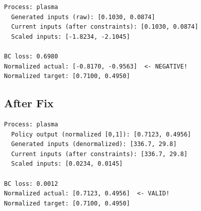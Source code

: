 \documentclass[11pt,a4paper]{article}
\begin{document}
\begin{verbatim}
Process: plasma
  Generated inputs (raw): [0.1030, 0.0874]
  Current inputs (after constraints): [0.1030, 0.0874]
  Scaled inputs: [-1.8234, -2.1045]

BC loss: 0.6980
Normalized actual: [-0.8170, -0.9563]  <- NEGATIVE!
Normalized target: [0.7100, 0.4950]
\end{verbatim}

\subsection{After Fix}

\begin{verbatim}
Process: plasma
  Policy output (normalized [0,1]): [0.7123, 0.4956]
  Generated inputs (denormalized): [336.7, 29.8]
  Current inputs (after constraints): [336.7, 29.8]
  Scaled inputs: [0.0234, 0.0145]

BC loss: 0.0012
Normalized actual: [0.7123, 0.4956]  <- VALID!
Normalized target: [0.7100, 0.4950]
\end{verbatim}
\end{document}
